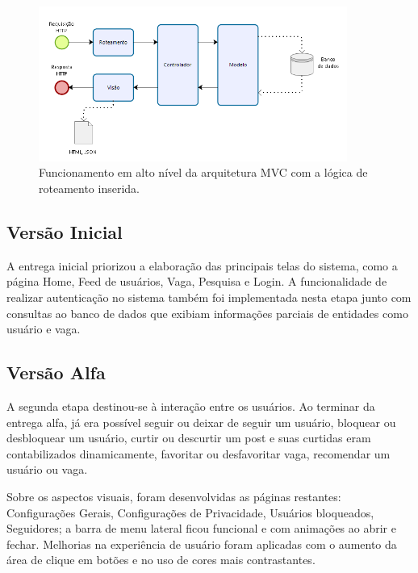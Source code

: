 \begin{figure}[h]
    \caption{ Funcionamento em alto nível da arquitetura MVC com a lógica de roteamento inserida.}
        \begin{center}
            \includegraphics[width=0.9\textwidth]{figuras/roteamento.png}
        \end{center}
    \label{routeFramework}
\end{figure}


\subsection{Versão Inicial}
\label{implementacaoIR}

A entrega inicial priorizou a elaboração das principais telas do sistema, como a página Home, Feed de usuários, Vaga, Pesquisa e Login. A funcionalidade de realizar autenticação no sistema também foi implementada nesta etapa junto com consultas ao banco de dados que exibiam informações parciais de entidades como usuário e vaga.

\subsection{Versão Alfa}
\label{implementacaoAR}

A segunda etapa destinou-se à interação entre os usuários. Ao terminar da entrega alfa, já era possível seguir ou deixar de seguir um usuário, bloquear ou desbloquear um usuário, curtir ou descurtir um post e suas curtidas eram contabilizados dinamicamente, favoritar ou desfavoritar vaga, recomendar um usuário ou vaga. 

Sobre os aspectos visuais, foram desenvolvidas as páginas restantes: Configurações Gerais, Configurações de Privacidade, Usuários bloqueados, Seguidores; a barra de menu lateral ficou funcional e com animações ao abrir e fechar. Melhorias na experiência de usuário foram aplicadas com o aumento da área de clique em botões e no uso de cores mais contrastantes.

